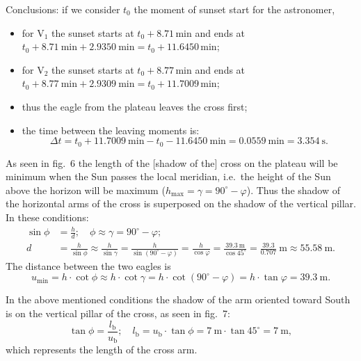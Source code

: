 \begin{description}
  Conclusions: if we consider $t_0$ the moment of sunset start for the
  astronomer,
  \begin{itemize}
  \item for $\mathrm{V}_1$ the sunset starts at $t_0 + 8.71$\,min and ends
    at $t_0 + 8.71\ \mathrm{min} + 2.9350\ \mathrm{min}
    = t_0 + 11.6450$\,min;
  \item for $\mathrm{V}_2$ the sunset starts at $t_0 + 8.77$\,min and ends
    at $t_0 + 8.77\ \mathrm{min} + 2.9309\ \mathrm{min}
    = t_0 + 11.7009$\,min;
  \item thus the eagle from the plateau leaves the cross first;
  \item the time between the leaving moments is:
    \[ \Delta t = t_0 + 11.7009\ \mathrm{min}
       - t_0 - 11.6450\ \mathrm{min}
       = 0.0559\ \mathrm{min} = 3.354\ \mathrm{s}. \]
  \end{itemize}

\item[B.1)] As seen in fig.~6 the length of the [shadow of the] cross on the
  plateau will be minimum when the Sun passes the local meridian, i.e.\ the
  height of the Sun above the horizon will be maximum
  ($h_{\mathrm{max}} = \gamma = 90^\circ - \varphi$). Thus the shadow of the
  horizontal arms of the cross is superposed on the shadow of the vertical
  pillar.
  In these conditions:
  \begin{align*}
  \sin\phi &= \frac{h}{d};\quad
    \phi \approx \gamma = 90^\circ - \varphi;\\
  d &= \frac{h}{\sin\phi} \approx \frac{h}{\sin\gamma}
    = \frac{h}{\sin(90^\circ - \varphi)}
    = \frac{h}{\cos\varphi}
    = \frac{39.3\ \mathrm{m}}{\cos 45^\circ}
    = \frac{39.3}{0.707}\ \mathrm{m} \approx 55.58\ \mathrm{m}.
  \end{align*}
  The distance between the two eagles is
  \[ u_{\mathrm{min}} = h\cdot\cot\phi \approx h\cdot\cot\gamma
     = h\cdot\cot(90^\circ - \varphi)
     = h\cdot\tan\varphi = 39.3\ \mathrm{m}. \]

\item[B.2)] In the above mentioned conditions the shadow of the arm oriented
  toward South is on the vertical pillar of the cross, as seen in fig.~7:
  \[ \tan\phi = \frac{l_{\mathrm{b}}}{u_{\mathrm{b}}};\quad
     l_{\mathrm{b}} = u_{\mathrm{b}}\cdot\tan\phi
     = 7\ \mathrm{m}\cdot\tan 45^\circ = 7\ \mathrm{m}, \]
  which represents the length of the cross arm.


\end{description}
